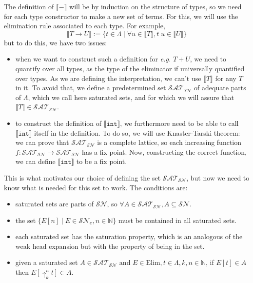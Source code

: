 \documentclass{article}
\newcommand{\SN}[0]{\mathcal{SN}}
\renewcommand{\int}[0]{\texttt{int}}
\newcommand{\bN}[0]{\mathbb N}
\newcommand{\lift}[2]{\uparrow_{#1}^{#2}}
\newcommand{\Elim}[0]{\mathrm{Elim}}
\newcommand{\SAT}[0]{\mathcal{SAT}_{\mathcal{SN}}}
\theoremstyle{definition}
\begin{document}
The definition of $\llbracket-\rrbracket$ will be by induction on the structure of types, so we need for each
type constructor to make a new set of terms. For this, we will use the elimination rule associated to each
type. For example,
$$\llbracket T \to U \rrbracket := \{ t \in \Lambda\mid \forall u \in \llbracket T \rrbracket, t\;u\in
\llbracket U \rrbracket\}$$
but to do this, we have two issues:
\begin{itemize}
    \item when we want to construct such a definition for \textit{e.g.} $T + U$, we need to quantify over all
    types, as the type of the eliminator if universally quantified over types. As we are defining the
    interpretation, we can't use $\llbracket T \rrbracket$ for any $T$ in it. To avoid that, we define a
    predetermined set $\SAT$ of adequate parts of $\Lambda$, which we call here saturated sets, and for which
    we will assure that $\llbracket T \rrbracket\in \SAT$.
    \item to construct the definition of $\llbracket \int \rrbracket$, we furthermore need to be able to call
    $\llbracket\int\rrbracket$ itself in the definition. To do so, we will use Knaster-Tarski theorem: we can
    prove that $\SAT$ is a complete lattice, so each increasing function $f : \SAT\to\SAT$ has a fix point.
    Now, constructing the correct function, we can define $\llbracket \int\rrbracket$ to be a fix point.
\end{itemize}

This is what motivates our choice of defining the set $\SAT$, but now we need to know what is needed for this
set to work. The conditions are:
\begin{itemize}
    \item saturated sets are parts of $\SN$, so $\forall A \in\SAT, A \subseteq \SN$.
    \item the set $\{E[n]\mid E\in\SN_e, n\in\bN\}$ must be contained in all saturated sets.
    \item each saturated set has the saturation property, which is an analogous of the weak head expansion
    but with the property of being in the set.
    \item given a saturated set $A\in\SAT$ and $E\in\Elim, t\in\Lambda, k,n\in\bN$, if $E[t]\in A$ then
    $E[\lift k n t]\in A$.
\end{itemize}
\end{document}
